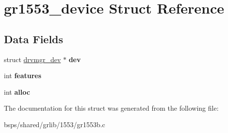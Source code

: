 \hypertarget{structgr1553__device}{}\section{gr1553\+\_\+device Struct Reference}
\label{structgr1553__device}
\subsection*{Data Fields}
\begin{DoxyCompactItemize}
\item 
\mbox{\label{structgr1553__device_a4348793d869a3851fb3488494848def6}} 
struct \mbox{\hyperlink{structdrvmgr__dev}{drvmgr\+\_\+dev}} $\ast$ {\bfseries dev}
\item 
\mbox{\label{structgr1553__device_ae9fa9412f6d0b6923deebe140349a68b}} 
int {\bfseries features}
\item 
\mbox{\label{structgr1553__device_a835516a8ad5853da8da2e4a1507df634}} 
int {\bfseries alloc}
\end{DoxyCompactItemize}


The documentation for this struct was generated from the following file\+:\begin{DoxyCompactItemize}
\item 
bsps/shared/grlib/1553/gr1553b.\+c\end{DoxyCompactItemize}
